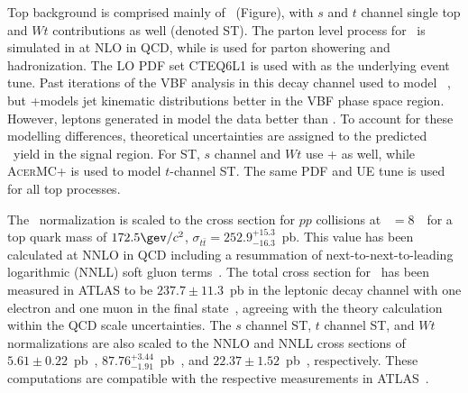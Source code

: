 
Top background is comprised mainly of \ttbar~(Figure), with $s$ and $t$
channel single top and $Wt$ contributions as well (denoted ST). The parton
level process for \ttbar~is simulated in
\POWHEG at NLO in QCD, while  is used for parton showering and
hadronization. The LO PDF set CTEQ6L1 is used with  as
the underlying event tune. Past iterations of the VBF analysis in this
decay channel used \MCATNLO to model
\ttbar~\cite{bib:hww_moriond_2013}, but \POWHEGns +\PYTHIA models jet
kinematic distributions better in the VBF phase space region. However, leptons generated in
\MCATNLO model the data better than \POWHEG. To account for these
modelling differences, theoretical uncertainties are assigned to the
predicted \ttbar~yield in the signal region. For ST,
$s$ channel and $Wt$ use \POWHEGns + as well, while
\textsc{AcerMC}+ is used to model $t$-channel ST. The same PDF
and UE tune is used for all top processes. 

The \ttbar~normalization is scaled to the cross section for $pp$
collisions at \sqrts~$=8$~\tev~for a top quark mass of
$172.5 \gev/c^2$, $\sigma_{t\bar{t}}=252.9^{+15.3}_{-16.3}$~pb. This value has been
calculated at NNLO in QCD including a resummation of
next-to-next-to-leading logarithmic (NNLL) soft gluon
terms~\cite{bib:Cacciari:2011hy,bib:Beneke:2011mq,bib:Baernreuther:2012ws,bib:Czakon:2012zr,bib:Czakon:2012pz,bib:Czakon:2013goa,bib:Czakon:2011xx}.
The total cross section for \ttbar~has been measured in ATLAS to be
$237.7\pm11.3$~pb in the leptonic decay channel with one
electron and one muon in the final
state~\cite{bib:ttbar_cross_section}, agreeing with the
theory calculation within the QCD scale uncertainties. The $s$ channel
ST, $t$ channel ST, and $Wt$ normalizations are also scaled to the
NNLO and NNLL cross sections of $5.61\pm0.22$~pb~\cite{bib:Kidonakis:2010tc},
$87.76^{+3.44}_{-1.91}$~pb~\cite{bib:Kidonakis:2011wy}, and
$22.37\pm1.52$~pb~\cite{bib:Kidonakis:2010ux}, respectively. These
computations are compatible with the respective measurements in
ATLAS~\cite{bib:tchan_cross_section,bib:Wt_cross_section}. 

